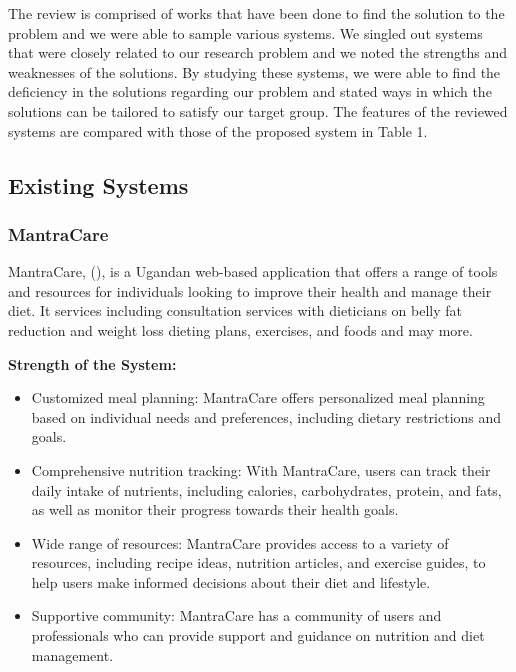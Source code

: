 \documentclass{article}
\begin{document}
The review is comprised of works that have been done to find the solution to the problem and we were able to sample various systems. We singled out systems that were closely related to our research problem and we noted the strengths and weaknesses of the solutions. By studying these systems, we were able to find the deficiency in the solutions regarding our problem and stated ways in which the solutions can be tailored to satisfy our target group. The features of the reviewed systems are compared with those of the proposed system in Table 1.

\subsection{Existing Systems}

\subsubsection{MantraCare}

MantraCare, (\cite{mantracare}), is a Ugandan web-based application that offers a range of tools and resources for individuals looking to improve their health and manage their diet. It services including consultation services with dieticians on belly fat reduction and weight loss dieting plans, exercises, and foods and may more.

\textbf{Strength of the System:}

\begin{itemize}

\item Customized meal planning: MantraCare offers personalized meal planning based on individual needs and preferences, including dietary restrictions and goals.
\item Comprehensive nutrition tracking: With MantraCare, users can track their daily intake of nutrients, including calories, carbohydrates, protein, and fats, as well as monitor their progress towards their health goals.
\item Wide range of resources: MantraCare provides access to a variety of resources, including recipe ideas, nutrition articles, and exercise guides, to help users make informed decisions about their diet and lifestyle.
\item Supportive community: MantraCare has a community of users and professionals who can provide support and guidance on nutrition and diet management.

\end{itemize}
\end{document}
